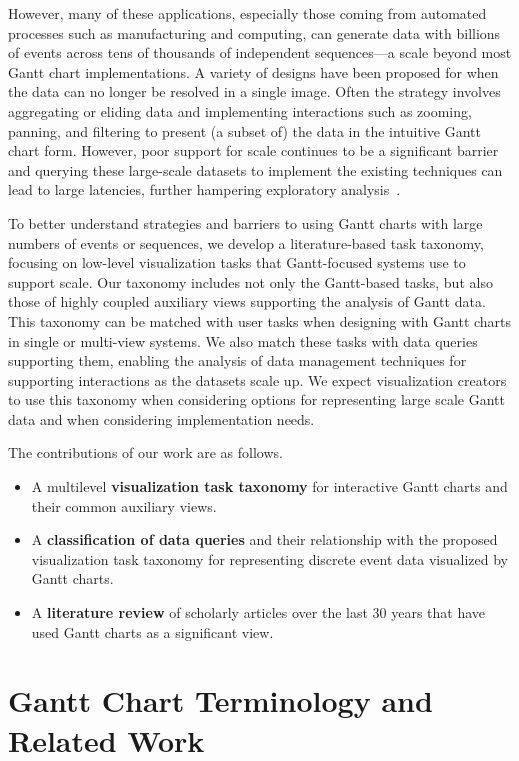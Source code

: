 \begin{refsection}
However, many of these applications, especially those coming from automated processes such as manufacturing and computing, can generate data with billions of events across tens of thousands of independent sequences---a scale beyond most Gantt chart implementations. A variety of designs have been proposed for when the data can no longer be resolved in a single image. Often the strategy involves aggregating or eliding data and implementing interactions such as zooming, panning, and filtering to present (a subset of) the data in the intuitive Gantt chart form. However, poor support for scale continues to be a significant barrier~\cite{isaacs2014state, davidson2023qualitative} and querying these large-scale datasets to implement the existing techniques can lead to large latencies, further hampering exploratory analysis~\cite{liu2014latency}. 

To better understand strategies and barriers to using Gantt charts with large numbers of events or sequences, we develop a literature-based task taxonomy, focusing on low-level visualization tasks that Gantt-focused systems use to support scale. Our taxonomy includes not only the Gantt-based tasks, but also those of highly coupled auxiliary views supporting the analysis of Gantt data. This taxonomy can be matched with user tasks when designing with Gantt charts in single or multi-view systems. We also match these tasks with data queries supporting them, enabling the analysis of data management techniques for supporting interactions as the datasets scale up. We expect visualization creators to use this taxonomy when considering options for representing large scale Gantt data and when considering implementation needs.

The contributions of our work are as follows.

\begin{itemize}\itemsep0.25ex
    \item A multilevel \textbf{visualization task taxonomy} for interactive Gantt charts and their common auxiliary views.
    \item A \textbf{classification of data queries} and their relationship with the proposed visualization task taxonomy for representing discrete event data visualized by Gantt charts.
    \item A \textbf{literature review} of scholarly articles over the last 30 years that have used Gantt charts as a significant view.
\end{itemize}


\section{Gantt Chart Terminology and Related Work}
\label{sec:background}


\end{refsection}
